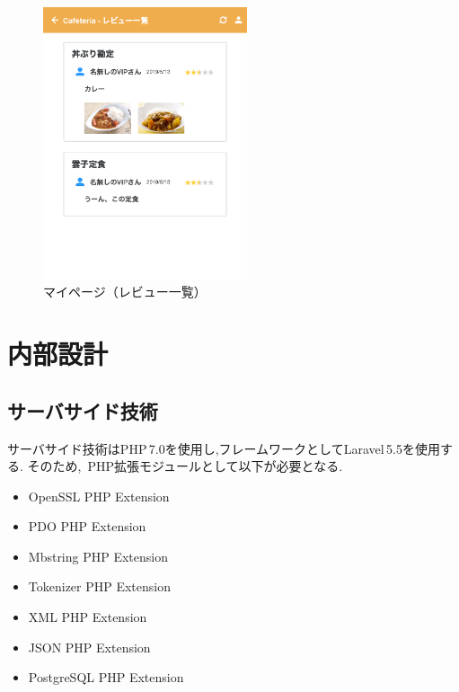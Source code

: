 \documentclass[a4paper]{ltjsarticle}
\begin{document}
        \begin{figure}[ht]
            \center
            \includegraphics[width=60mm]{ui/review-list.png}
            \caption{マイページ（レビュー一覧）}
            \label{img:review-list}
        \end{figure}

\section{内部設計}
    \subsection{サーバサイド技術}
        サーバサイド技術はPHP\,7.0を使用し,フレームワークとしてLaravel\,5.5を使用する.
        そのため,\, PHP拡張モジュールとして以下が必要となる.
        \begin{itemize}
            \item OpenSSL PHP Extension
            \item PDO PHP Extension
            \item Mbstring PHP Extension
            \item Tokenizer PHP Extension
            \item XML PHP Extension
            \item JSON PHP Extension
            \item PostgreSQL PHP Extension
        \end{itemize}
\end{document}
